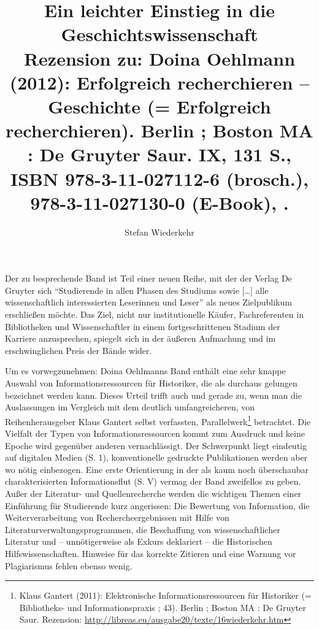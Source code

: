 \documentclass[a4paper,
fontsize=11pt,
oneside,
numbers=noperiodatend,
parskip=half-,
bibliography=totoc,
final
]{scrartcl}
\title{\LARGE{Ein leichter Einstieg in die Geschichtswissenschaft} \\ \large{Rezension zu: Doina Oehlmann (2012): Erfolgreich recherchieren –
Geschichte (= Erfolgreich recherchieren). Berlin ; Boston MA : De
Gruyter Saur. IX, 131 S., ISBN 978-3-11-027112-6 (brosch.),
978-3-11-027130-0 (E-Book), \EUR{19,95}.}} %
\author{Stefan Wiederkehr} %
\date{}
\begin{document}
\maketitle
\thispagestyle{fancyplain} 





Der zu besprechende Band ist Teil einer neuen Reihe, mit der der Verlag
De Gruyter sich \enquote{Studierende in allen Phasen des Studiums sowie
{[}\ldots{}{]} alle wissenschaftlich interessierten Leserinnen und
Leser} als neues Zielpublikum erschließen möchte. Das Ziel, nicht nur
institutionelle Käufer, Fachreferenten in Bibliotheken und
Wissenschaftler in einem fortgeschrittenen Stadium der Karriere
anzusprechen, spiegelt sich in der äußeren Aufmachung und im
erschwinglichen Preis der Bände wider.

Um es vorwegzunehmen: Doina Oehlmanns Band enthält eine sehr knappe
Auswahl von Informationsressourcen für Historiker, die als durchaus
gelungen bezeichnet werden kann. Dieses Urteil trifft auch und gerade
zu, wenn man die Auslassungen im Vergleich mit dem deutlich
umfangreicheren, von Reihenherausgeber Klaus Gantert selbst verfassten,
Parallelwerk\footnote{Klaus Gantert (2011): Elektronische
  Informationsressourcen für Historiker (= Bibliotheks- und
  Informationspraxis ; 43). Berlin ; Boston MA : De Gruyter Saur.
  Rezension: \url{http://libreas.eu/ausgabe20/texte/16wiederkehr.htm}}
betrachtet. Die Vielfalt der Typen von Informationsressourcen kommt zum
Ausdruck und keine Epoche wird gegenüber anderen vernachlässigt. Der
Schwerpunkt liegt eindeutig auf digitalen Medien (S. 1), konventionelle
gedruckte Publikationen werden aber wo nötig einbezogen. Eine erste
Orientierung in der als kaum noch überschaubar charakterisierten
Informationsflut (S. V) vermag der Band zweifellos zu geben. Außer der
Literatur- und Quellenrecherche werden die wichtigen Themen einer
Einführung für Studierende kurz angerissen: Die Bewertung von
Information, die Weiterverarbeitung von Rechercheergebnissen mit Hilfe
von Literaturverwaltungsprogrammen, die Beschaffung von
wissenschaftlicher Literatur und -- unnötigerweise als Exkurs deklariert
-- die Historischen Hilfswissenschaften. Hinweise für das korrekte
Zitieren und eine Warnung vor Plagiarismus fehlen ebenso wenig.
\end{document}
